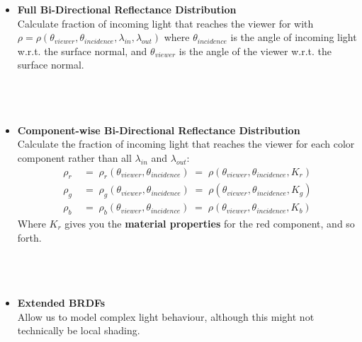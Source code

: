 \documentclass[]{article}
\begin{document}
\begin{itemize}
    \item \textbf{Full Bi-Directional Reflectance Distribution} \\
        Calculate fraction of incoming light that reaches the viewer for with $\rho = \rho(\theta_{viewer}, \theta_{incidence}, \lambda_{in}, \lambda_{out})$ where $\theta_{incidence}$ is the angle of incoming light w.r.t. the surface normal, and $\theta_{viewer}$ is the angle of the viewer w.r.t. the surface normal. \\ \\
    \textwidth{Good:\enspace\hrulefill}    \\ \\
    \textwidth{Bad:\enspace\hrulefill}
          
    \item \textbf{Component-wise Bi-Directional Reflectance Distribution} \\ 
    Calculate the fraction of incoming light that reaches the viewer for each color component rather than all $\lambda_{in}$ and $\lambda_{out}$: 
    \begin{align*}
        \rho_r \;&=\; \rho_r(\theta_{viewer}, \theta_{incidence}) \;=\; \rho(\theta_{viewer}, \theta_{incidence}, K_{r}) \\
        \rho_g \;&=\; \rho_g(\theta_{viewer}, \theta_{incidence}) \;=\; \rho(\theta_{viewer}, \theta_{incidence}, K_{g})  \\
        \rho_b \;&=\; \rho_b(\theta_{viewer}, \theta_{incidence}) \;=\; \rho(\theta_{viewer}, \theta_{incidence}, K_{b}) 
    \end{align*}
    Where $K_{r}$ gives you the \textbf{material properties} for the red component, and so forth. \\ \\
    \textwidth{Good:\enspace\hrulefill}    \\ \\
    \textwidth{Bad:\enspace\hrulefill}
    
    
    \item \textbf{Extended BRDFs} \\
        Allow us to model complex light behaviour, although this might not technically be local shading. \\ \\
    \textwidth{Good:\enspace\hrulefill}    \\ \\
    \textwidth{Bad:\enspace\hrulefill}

\end{itemize} \\ \\
\end{document}
